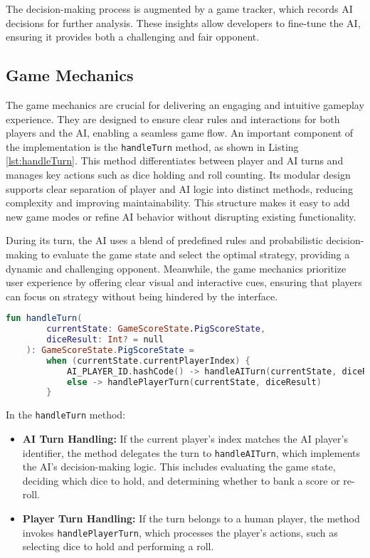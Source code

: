 The decision-making process is augmented by a game tracker, which records AI decisions for further analysis. These insights allow developers to fine-tune the AI, ensuring it provides both a challenging and fair opponent.

\subsection{Game Mechanics}

The game mechanics are crucial for delivering an engaging and intuitive gameplay experience. They are designed to ensure clear rules and interactions for both players and the AI, enabling a seamless game flow.
An important component of the implementation is the \texttt{handleTurn} method, as shown in Listing \ref{lst:handleTurn}. This method differentiates between player and AI turns and manages key actions such as dice holding and roll counting. Its modular design supports clear separation of player and AI logic into distinct methods, reducing complexity and improving maintainability. This structure makes it easy to add new game modes or refine AI behavior without disrupting existing functionality.

During its turn, the AI uses a blend of predefined rules and probabilistic decision-making to evaluate the game state and select the optimal strategy, providing a dynamic and challenging opponent. Meanwhile, the game mechanics prioritize user experience by offering clear visual and interactive cues, ensuring that players can focus on strategy without being hindered by the interface.

\begin{lstlisting}[language=Kotlin, caption={handleTurn Function}, label=lst:handleTurn]
fun handleTurn(
        currentState: GameScoreState.PigScoreState,
        diceResult: Int? = null
    ): GameScoreState.PigScoreState =
        when (currentState.currentPlayerIndex) {
            AI_PLAYER_ID.hashCode() -> handleAITurn(currentState, diceResult)
            else -> handlePlayerTurn(currentState, diceResult)
        }
\end{lstlisting}
\label{lst:handleTurn}

In the \texttt{handleTurn} method:
\begin{itemize}
    \item \textbf{AI Turn Handling:} If the current player's index matches the AI player's identifier, the method delegates the turn to \texttt{handleAITurn}, which implements the AI's decision-making logic. This includes evaluating the game state, deciding which dice to hold, and determining whether to bank a score or re-roll.
    \item \textbf{Player Turn Handling:} If the turn belongs to a human player, the method invokes \texttt{handlePlayerTurn}, which processes the player's actions, such as selecting dice to hold and performing a roll.
\end{itemize}

